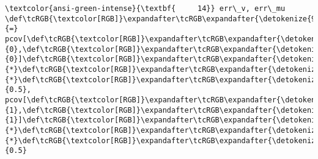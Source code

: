 \documentclass[11pt]{article}
\begin{document}
\begin{Verbatim}[commandchars=\\\{\}, frame=single, framerule=2mm, rulecolor=\color{outerrorbackground}]
\textcolor{ansi-green-intense}{\textbf{     14}} err\_v, err\_mu \def\tcRGB{\textcolor[RGB]}\expandafter\tcRGB\expandafter{\detokenize{98,98,98}}{=} pcov[\def\tcRGB{\textcolor[RGB]}\expandafter\tcRGB\expandafter{\detokenize{98,98,98}}{0},\def\tcRGB{\textcolor[RGB]}\expandafter\tcRGB\expandafter{\detokenize{98,98,98}}{0}]\def\tcRGB{\textcolor[RGB]}\expandafter\tcRGB\expandafter{\detokenize{98,98,98}}{*}\def\tcRGB{\textcolor[RGB]}\expandafter\tcRGB\expandafter{\detokenize{98,98,98}}{*}\def\tcRGB{\textcolor[RGB]}\expandafter\tcRGB\expandafter{\detokenize{98,98,98}}{0.5}, pcov[\def\tcRGB{\textcolor[RGB]}\expandafter\tcRGB\expandafter{\detokenize{98,98,98}}{1},\def\tcRGB{\textcolor[RGB]}\expandafter\tcRGB\expandafter{\detokenize{98,98,98}}{1}]\def\tcRGB{\textcolor[RGB]}\expandafter\tcRGB\expandafter{\detokenize{98,98,98}}{*}\def\tcRGB{\textcolor[RGB]}\expandafter\tcRGB\expandafter{\detokenize{98,98,98}}{*}\def\tcRGB{\textcolor[RGB]}\expandafter\tcRGB\expandafter{\detokenize{98,98,98}}{0.5}


\end{Verbatim}
\end{document}
